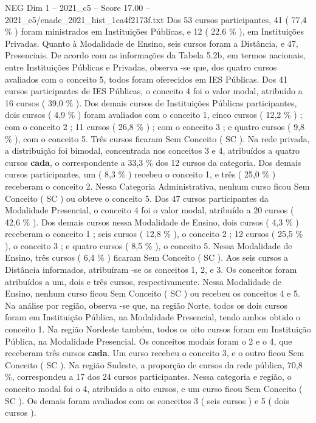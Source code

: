 \begin{textsample}{NEG Dim 1 – 2021\_c5 – Score 17.00 – 2021\_c5/enade\_2021\_hist\_1ca4f2173f.txt}
Dos 53 cursos participantes, 41 ( 77,4 \% ) foram ministrados em Instituições Públicas, e 12 ( 22,6 \% ), em Instituições Privadas.
Quanto à Modalidade de Ensino, seis cursos foram a Distância, e 47, Presenciais.
De acordo com as informações da Tabela 5.2b, em termos nacionais, entre Instituições Públicas e Privadas, observa -se que, dos quatro cursos avaliados com o conceito 5, todos foram oferecidos em IES Públicas.
Dos 41 cursos participantes de IES Públicas, o conceito 4 foi o valor modal, atribuído a 16 cursos ( 39,0 \% ).
Dos demais cursos de Instituições Públicas participantes, dois cursos ( 4,9 \% ) foram avaliados com o conceito 1, cinco cursos ( 12,2 \% ) ; com o conceito 2 ; 11 cursos ( 26,8 \% ) ; com o conceito 3 ; e quatro cursos ( 9,8 \% ), com o conceito 5.
Três cursos ficaram Sem Conceito ( SC ).
Na rede privada, a distribuição foi bimodal, concentrada nos conceitos 3 e 4, atribuídos a quatro cursos \textbf{cada}, o correspondente a 33,3 \% dos 12 cursos da categoria.
Dos demais cursos participantes, um ( 8,3 \% ) recebeu o conceito 1, e três ( 25,0 \% ) receberam o conceito 2.
Nessa Categoria Administrativa, nenhum curso ficou Sem Conceito ( SC ) ou obteve o conceito 5.
Dos 47 cursos participantes da Modalidade Presencial, o conceito 4 foi o valor modal, atribuído a 20 cursos ( 42,6 \% ).
Dos demais cursos nessa Modalidade de Ensino, dois cursos ( 4,3 \% ) receberam o conceito 1 ; seis cursos ( 12,8 \% ), o conceito 2 ; 12 cursos ( 25,5 \% ), o conceito 3 ; e quatro cursos ( 8,5 \% ), o conceito 5.
Nessa Modalidade de Ensino, três cursos ( 6,4 \% ) ficaram Sem Conceito ( SC ).
Aos seis cursos a Distância informados, atribuíram -se os conceitos 1, 2, e 3.
Os conceitos foram atribuídos a um, dois e três cursos, respectivamente.
Nessa Modalidade de Ensino, nenhum curso ficou Sem Conceito ( SC ) ou recebeu os conceitos 4 e 5.
Na análise por região, observa -se que, na região Norte, todos os dois cursos foram em Instituição Pública, na Modalidade Presencial, tendo ambos obtido o conceito 1.
Na região Nordeste também, todos os oito cursos foram em Instituição Pública, na Modalidade Presencial.
Os conceitos modais foram o 2 e o 4, que receberam três cursos \textbf{cada}.
Um curso recebeu o conceito 3, e o outro ficou Sem Conceito ( SC ).
Na região Sudeste, a proporção de cursos da rede pública, 70,8 \%, correspondeu a 17 dos 24 cursos participantes.
Nessa categoria e região, o conceito modal foi o 4, atribuído a oito cursos, e um curso ficou Sem Conceito ( SC ).
Os demais foram avaliados com os conceitos 3 ( seis cursos ) e 5 ( dois cursos ).

\end{textsample}
